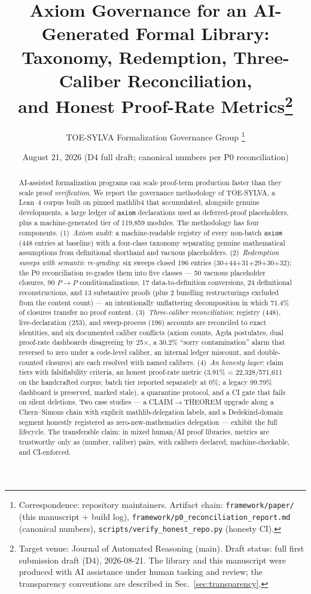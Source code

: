 \documentclass[11pt,a4paper]{article}
\title{\textbf{Axiom Governance for an AI-Generated Formal Library:\\
Taxonomy, Redemption, Three-Caliber Reconciliation,\\
and Honest Proof-Rate Metrics\thanks{Target venue: Journal of
Automated Reasoning (main). Draft status: full first submission
draft (D4), 2026-08-21. The library and this manuscript were
produced with AI assistance under human tasking and review; the
transparency conventions are described in
Sec.~\ref{sec:transparency}.}}}
\author{TOE-SYLVA Formalization Governance Group%
\thanks{Correspondence: repository maintainers. Artifact chain:
\texttt{framework/paper/} (this manuscript + build log),
\texttt{framework/p0\_reconciliation\_report.md} (canonical
numbers), \texttt{scripts/verify\_honest\_repo.py} (honesty CI).}}
\date{August 21, 2026 \quad (D4 full draft; canonical numbers per
P0 reconciliation)}
\begin{document}
\maketitle

\begin{abstract}
\noindent AI-assisted formalization programs can scale proof-term
production faster than they scale proof \emph{verification}. We
report the governance methodology of TOE-SYLVA, a Lean~4 corpus
built on pinned mathlib4 that accumulated, alongside genuine
developments, a large ledger of \texttt{axiom} declarations used as
deferred-proof placeholders, plus a machine-generated tier of
119,859 modules. The methodology has four components.
(1)~\emph{Axiom audit}: a machine-readable registry of every
non-batch \texttt{axiom} (448 entries at baseline) with a
four-class taxonomy separating genuine mathematical assumptions
from definitional shorthand and vacuous placeholders.
(2)~\emph{Redemption sweeps with semantic re-grading}: six sweeps
closed 196 entries (30+44+31+29+30+32); the P0 reconciliation
re-grades them into five classes --- 50 vacuous placeholder
closures, 90 $P\to P$ conditionalizations, 17 data-to-definition
conversions, 24 definitional reconstructions, and 13 substantive
proofs (plus 2 bundling restructurings excluded from the content
count) --- an intentionally unflattering decomposition in which
71.4\% of closures transfer no proof content.
(3)~\emph{Three-caliber reconciliation}: registry (448),
live-declaration (253), and sweep-process (196) accounts are
reconciled to exact identities, and six documented caliber
conflicts (axiom counts, Agda postulates, dual proof-rate
dashboards disagreeing by 25$\times$, a 30.2\% ``sorry
contamination'' alarm that reversed to zero under a code-level
caliber, an internal ledger miscount, and double-counted
closures) are each resolved with named calibers.
(4)~\emph{An honesty layer}: claim tiers with falsifiability
criteria, an honest proof-rate metric (3.91\% = 22,328/571,611 on
the handcrafted corpus; batch tier reported separately at 0\%; a
legacy 99.79\% dashboard is preserved, marked stale), a quarantine
protocol, and a CI gate that fails on silent deletions. Two case
studies --- a CLAIM$\to$THEOREM upgrade along a Chern--Simons
chain with explicit mathlib-delegation labels, and a
Dedekind-domain segment honestly registered as zero-new-mathematics
delegation --- exhibit the full lifecycle. The transferable claim:
in mixed human/AI proof libraries, metrics are trustworthy only as
(number, caliber) pairs, with calibers declared, machine-checkable,
and CI-enforced.
\end{abstract}
\end{document}
